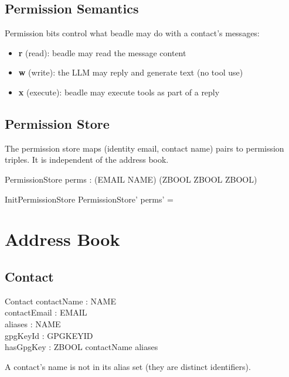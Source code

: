 \documentclass[a4paper,10pt,fleqn]{article}
\begin{document}
\subsection{Permission Semantics}

Permission bits control what beadle may do with a contact's messages:

\begin{itemize}
\item \textbf{r} (read): beadle may read the message content
\item \textbf{w} (write): the LLM may reply and generate text (no tool use)
\item \textbf{x} (execute): beadle may execute tools as part of a reply
\end{itemize}

\subsection{Permission Store}

The permission store maps (identity email, contact name) pairs to
permission triples. It is independent of the address book.

\begin{schema}{PermissionStore}
perms : (EMAIL \cross NAME) \pfun (ZBOOL \cross ZBOOL \cross ZBOOL)
\end{schema}

\begin{schema}{InitPermissionStore}
PermissionStore'
\where
perms' = \emptyset
\end{schema}

\section{Address Book}

\subsection{Contact}

\begin{schema}{Contact}
contactName : NAME \\
contactEmail : EMAIL \\
aliases : \power NAME \\
gpgKeyId : GPGKEYID \\
hasGpgKey : ZBOOL
\where
contactName \notin aliases
\end{schema}

A contact's name is not in its alias set (they are distinct identifiers).
\end{document}
